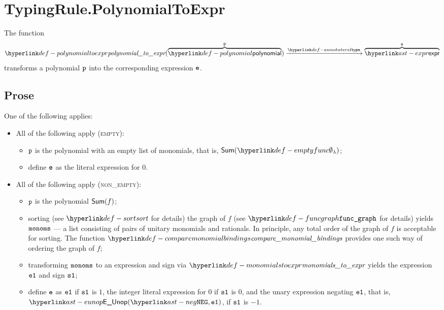 \section{TypingRule.PolynomialToExpr \label{sec:TypingRule.PolynomialToExpr}}
\hypertarget{def-polynomialtoexpr}{}
The function
\[
\polynomialtoexpr(\overname{\polynomial}{\vp}) \typearrow \overname{\expr}{\ve}
\]
transforms a polynomial $\texttt{p}$ into the corresponding expression $\texttt{e}$.

\subsection{Prose}
One of the following applies:
\begin{itemize}
  \item All of the following apply (\textsc{empty}):
  \begin{itemize}
    \item $\texttt{p}$ is the polynomial with an empty list of monomials, that is, $\Sum(\emptyfunc)$;
    \item define $\texttt{e}$ as the literal expression for $0$.
  \end{itemize}

  \item All of the following apply (\textsc{non\_empty}):
  \begin{itemize}
    \item $\texttt{p}$ is the polynomial $\textsf{Sum}(f)$;
    \item sorting (see $\sort$ for details) the graph of $f$ (see $\funcgraph$ for details)
          yields $\texttt{monoms}$ --- a list consisting of pairs of unitary monomials and rationals.
          In principle, any total order of the graph of $f$ is acceptable for sorting.
          The function $\comparemonomialbindings$ provides one such way of ordering
          the graph of $f$;
    \item transforming $\texttt{monoms}$ to an expression and sign via $\monomialstoexpr$ yields the expression $\texttt{e1}$
          and sign $\texttt{s1}$;
    \item define $\texttt{e}$ as $\texttt{e1}$ if $\texttt{s1}$ is $1$, the integer literal expression for $0$ if $\texttt{s1}$ is $0$,
          and the unary expression negating $\texttt{e1}$, that is,
          $\EUnop(\NEG, \veone)$, if $\texttt{s1}$ is $-1$.
  \end{itemize}
\end{itemize}

